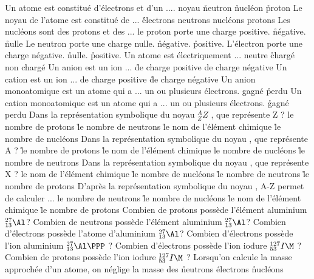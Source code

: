   \q
    Un atome est constitué d'électrons et d'un ....
    \rv 
    noyau
    \r
    neutron
    \r
    nucléon
    \r
    proton
  \q
    Le noyau de l'atome est constitué de ...
    \r 
    électrons
    \rv
    neutrons
    \rv
    nucléons
    \rv
    protons
      \q 
      Les nucléons sont des protons et des ...
    \q
         le proton porte une charge 
      \rv
       positive.
      \r
      négative.
      \r
      nulle
  \q 
  Le neutron porte une charge 
      \rv
      nulle.
      \r
      négative.
      \r
      positive.
  \q
  L'électron porte une charge
      \rv
      négative.
      \r
      nulle.
      \r
      positive.
  \q
  Un atome est électriquement ...
  \rv
  neutre
  \r
  chargé
  \rv
  non chargé
 \q
 Un anion est un ion ...
 \r
 de charge positive
 \rv
 de charge négative
  \q
  Un cation est un ion ...
 \rv
 de charge positive
 \r
 de charge négative
  \q
  Un anion monoatomique est un atome qui a ... un ou plusieurs électrons.
  \rv 
  gagné
  \r
  perdu
 \q
  Un cation monoatomique est un atome qui a ... un ou plusieurs électrons.
 \r 
  gagné
  \rv
  perdu
  \q
  Dans la représentation symbolique du noyau $_Z^AZ$ , que représente Z ?
   \rv
      le nombre de protons
      \r
      le nombre de neutrons
      \r
      le nom de l'élément chimique
      \r
      le nombre de nucléons
 \q
  Dans la représentation symbolique du noyau  , que représente A  ?
      \r
      le nombre de protons
      \r
      le nom de l'élément chimique
      \rv
      le nombre de nucléons
      \r
      le nombre de neutrons
 \q
  Dans la représentation symbolique du noyau  , que représente X  ?
      \rv
      le nom de l'élément chimique
      \r
      le nombre de nucléons
      \r
      le nombre de neutrons
      \r
      le nombre de protons
 \q
  D'après la représentation symbolique du noyau  , A-Z permet de calculer ...
      \rv
      le nombre de neutrons
      \r
      le nombre de nucléons
      \r
      le nom de l'élément chimique
      \r
      le nombre de protons
 \q
  Combien de protons possède l'élément aluminium $_{13}^{27}\Al$? 
 \q
  Combien de neutrons possède l'élément aluminium $_{13}^{27}\Al$? 
 \q
  Combien d'électrons possède l'atome d'aluminium $_{13}^{27}\Al$?
 \q
  Combien d'électrons possède l'ion aluminium $_{13}^{27}\Al\PPP$ ? 
 \q
  Combien d'électrons possède l'ion iodure $_{53}^{127}I\M $ ?
 \q
  Combien de protons possède l'ion iodure $_{53}^{127}I\M $  ?
 \q
  Lorsqu'on calcule la masse approchée d'un atome, on néglige la masse des
      \r
      neutrons
      \rv
      électrons
      \r
      nucléons

